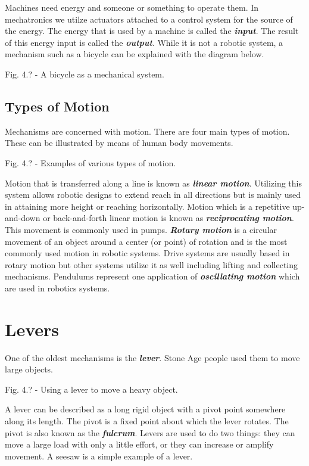 \documentclass[
]{book}
\begin{document}
Machines need energy and someone or something to operate them. In mechatronics we utilze actuators attached to a control system for the source of the energy. The energy that is used by a machine is called the \textbf{\emph{input}}. The result of this energy input is called the \textbf{\emph{output}}. While it is not a robotic system, a mechanism such as a bicycle can be explained with the diagram below.

Fig. 4.? - A bicycle as a mechanical system.

\hypertarget{types-of-motion}{%
\subsection{Types of Motion}\label{types-of-motion}}

Mechanisms are concerned with motion. There are four main types of motion. These can be illustrated by means of human body movements.

Fig. 4.? - Examples of various types of motion.

Motion that is transferred along a line is known as \textbf{\emph{linear motion}}. Utilizing this system allows robotic designs to extend reach in all directions but is mainly used in attaining more height or reaching horizontally. Motion which is a repetitive up-and-down or back-and-forth linear motion is known as \textbf{\emph{reciprocating motion}}. This movement is commonly used in pumps. \textbf{\emph{Rotary motion}} is a circular movement of an object around a center (or point) of rotation and is the most commonly used motion in robotic systems. Drive systems are usually based in rotary motion but other systems utilize it as well including lifting and collecting mechanisms. Pendulums represent one application of \textbf{\emph{oscillating motion}} which are used in robotics systems.

\hypertarget{levers}{%
\section{Levers}\label{levers}}

One of the oldest mechanisms is the \textbf{\emph{lever}}. Stone Age people used them to move large objects.

Fig. 4.? - Using a lever to move a heavy object.

A lever can be described as a long rigid object with a pivot point somewhere along its length. The pivot is a fixed point about which the lever rotates. The pivot is also known as the \textbf{\emph{fulcrum}}. Levers are used to do two things: they can move a large load with only a little effort, or they can increase or amplify movement. A seesaw is a simple example of a lever.
\end{document}
